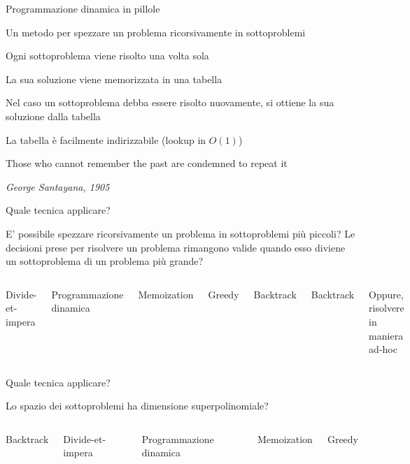 \begin{frame}{Programmazione dinamica in pillole}

\BIL
\item Un metodo per spezzare un problema ricorsivamente in sottoproblemi
\item Ogni sottoproblema viene risolto una volta sola
\item La sua soluzione viene memorizzata in una tabella
\item Nel caso un sottoproblema debba essere risolto nuovamente, si ottiene la
  sua soluzione dalla tabella
\item La tabella è facilmente indirizzabile (lookup in $O(1)$)
\EIL
    
\epigraph{\alert{Those who cannot remember the past are condemned to repeat it}
}{\textit{George Santayana, 1905}}

\end{frame}


\begin{frame}{Quale tecnica applicare?}

E' possibile spezzare ricorsivamente un problema in sottoproblemi più piccoli? Le decisioni prese per risolvere un problema rimangono valide quando esso diviene un sottoproblema di un problema più grande?

\bigskip
\begin{columns}[T]
\BIL
\item Divide-et-impera
\item \alert{Programmazione dinamica}
\item \alert{Memoization}
\item Greedy
\item Backtrack
\EIL
{}
\BIL
\item Backtrack
\item Oppure, risolvere in maniera ad-hoc
\EIL
\end{columns}

\end{frame}

\begin{frame}{Quale tecnica applicare?}

Lo spazio dei sottoproblemi ha dimensione superpolinomiale?

\bigskip
\begin{columns}[T]

\BIL
\item Backtrack
\EIL

\BIL
\item Divide-et-impera
\item \alert{Programmazione dinamica}
\item \alert{Memoization}
\item Greedy
\EIL

\end{columns}

\end{frame}


